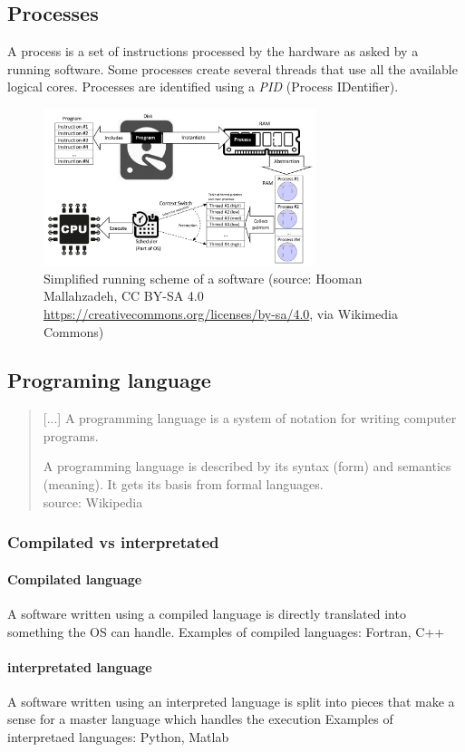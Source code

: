 \documentclass[11pt]{article}
\begin{document}
		\subsection{Processes}
			A process is a set of instructions processed by the hardware as asked by a running software.
			Some processes create several threads that use all the available logical cores. Processes are identified using a
			 \textit{PID} (Process IDentifier).
			\begin{figure}[!h]
				\begin{center}
					\includegraphics[width=300px]{figures/process.jpg}
					\caption{Simplified running scheme of a software \newline
					\scriptsize{(source: Hooman Mallahzadeh, CC BY-SA 4.0
					\url{https://creativecommons.org/licenses/by-sa/4.0}, via Wikimedia Commons})}
				\end{center}
			\end{figure}

		\subsection{Programing language}
			\begin{quotation}
			[...]
			A programming language is a system of notation for writing computer programs.
			
			A programming language is described by its syntax (form) and semantics (meaning). 
			It gets its basis from formal languages.\\
				\scriptsize{source: Wikipedia}
			\end{quotation}

			\subsubsection{Compilated vs interpretated}

				\paragraph{Compilated language}
					A software written using a compiled language is directly translated into something the OS can handle.
					Examples of compiled languages: Fortran, C++

				\paragraph{interpretated language}
					A software written using an interpreted language is split into pieces
					that make a sense for a master language which handles the execution
					Examples of interpretaed languages: Python, Matlab
\end{document}
